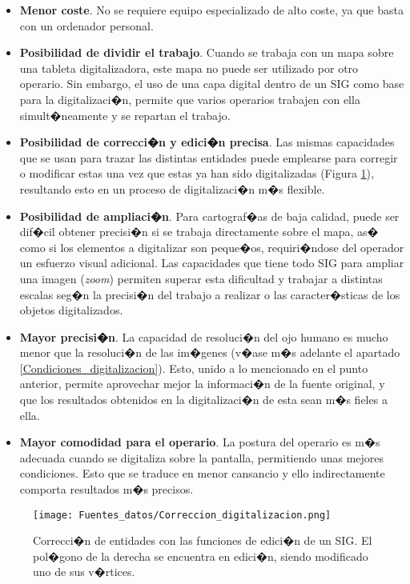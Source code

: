 \begin{itemize}
	\item \textbf{Menor coste}. No se requiere equipo especializado de alto coste, ya que basta con un ordenador personal. 
	\item \textbf{Posibilidad de dividir el trabajo}. Cuando se trabaja con un mapa sobre una tableta digitalizadora, este mapa no puede ser utilizado por otro operario. Sin embargo, el uso de una capa digital dentro de un SIG como base para la digitalizaci�n, permite que varios operarios trabajen con ella simult�neamente y se repartan el trabajo.
	\item \textbf{Posibilidad de correcci�n y edici�n precisa}. Las mismas capacidades que se usan para trazar las distintas entidades puede emplearse para corregir o modificar estas una vez que estas ya han sido digitalizadas (Figura \ref{Fig:Correccion_digitalizacion}), resultando esto en un proceso de digitalizaci�n m�s flexible.
	\item \textbf{Posibilidad de ampliaci�n}. Para cartograf�as de baja calidad, puede ser dif�cil obtener precisi�n si se trabaja directamente sobre el mapa, as� como si los elementos a digitalizar son peque�os, requiri�ndose del operador un esfuerzo visual adicional. Las capacidades que tiene todo SIG para ampliar una imagen (\emph{zoom}) permiten superar esta dificultad y trabajar a distintas escalas seg�n la precisi�n del trabajo a realizar o las caracter�sticas de los objetos digitalizados.
	\item \textbf{Mayor precisi�n}. La capacidad de resoluci�n del ojo humano es mucho menor que la resoluci�n de las im�genes (v�ase m�s adelante el apartado \ref{Condiciones_digitalizacion}). Esto, unido a lo mencionado en el punto anterior, permite aprovechar mejor la informaci�n de la fuente original, y que los resultados obtenidos en la digitalizaci�n de esta sean m�s fieles a ella.
	\item \textbf{Mayor comodidad para el operario}. La postura del operario es m�s adecuada cuando se digitaliza sobre la pantalla, permitiendo unas mejores condiciones. Esto que se traduce en menor cansancio y ello indirectamente comporta resultados m�s precisos.
\end{itemize}

\begin{figure}[!hbt]   
\centering
\texttt{[image: Fuentes\_datos/Correccion\_digitalizacion.png]}
\caption{\small Correcci�n de entidades con las funciones de edici�n de un SIG. El pol�gono de la derecha se encuentra en edici�n, siendo modificado uno de sus v�rtices.}
\label{Fig:Correccion_digitalizacion} 
\end{figure}

